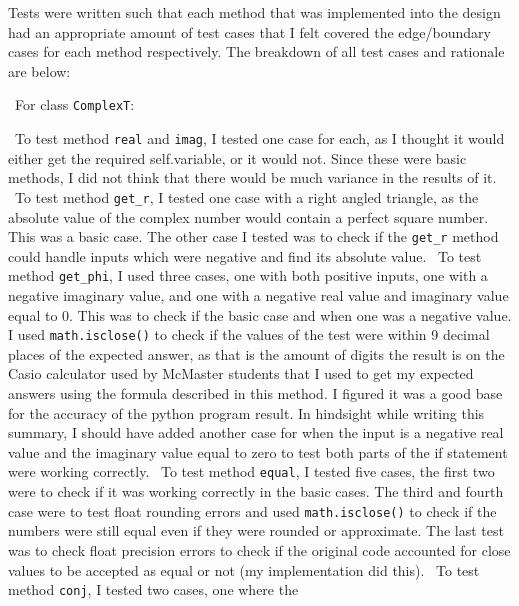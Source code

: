 \documentclass[12pt]{article}
\begin{document}
Tests were written such that each method that was implemented into the design
had an appropriate amount of test cases that I felt covered the edge/boundary 
cases for each method respectively. The breakdown of all test cases and 
rationale are below:

~\newline\noindent For class \verb|ComplexT|:

~\newline\noindent To test method \verb|real| and \verb|imag|, I tested one 
case for each, as I thought it would either get the required self.variable, 
or it would not. Since these were basic methods, I did not think that there 
would be much variance in the results of it. 
~\newline\noindent To test method \verb|get_r|, I tested one case with a right 
angled triangle, as the absolute value of the complex number would contain a 
perfect square number. This was a basic case. The other case I tested was to 
check if the \verb|get_r| method could handle inputs which were negative and 
find its absolute value. 
~\newline\noindent To test method \verb|get_phi|, I used three cases, one with 
both positive inputs, one with a negative imaginary value, and one with a negative 
real value and imaginary value equal to 0. This was to check if the basic case 
and when one was a negative value. I used \verb|math.isclose()| to check if the 
values of the test were within 9 decimal places of the expected answer, as that 
is the amount of digits the result is on the Casio calculator used by McMaster 
students that I used to get my expected answers using the formula described in 
this method. I figured it was a good base for the accuracy of the python program 
result. In hindsight while writing this summary, I should have added another case 
for when the input is a negative real value and the imaginary value equal to zero 
to test both parts of the if statement were working correctly. 
~\newline\noindent To test method \verb|equal|, I tested five cases, the first 
two were to check if it was working correctly in the basic cases. The third and 
fourth case were to test float rounding errors and used \verb|math.isclose()| to 
check if the numbers were still equal even if they were rounded or approximate. 
The last test was to check float precision errors to check if the original code 
accounted for close values to be accepted as equal or not (my implementation did 
this).
~\newline\noindent To test method \verb|conj|, I tested two cases, one where the 
\end{document}
